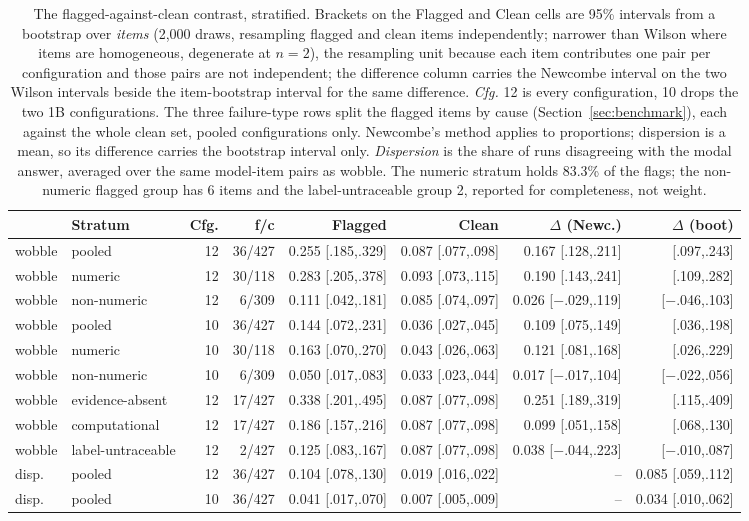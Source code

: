 \begin{table}[t]
\centering
\footnotesize
\setlength{\tabcolsep}{2.5pt}
\begin{tabular}{l l r r r r r r}
\toprule
 & Stratum & Cfg. & f/c & Flagged & Clean & $\Delta$ (Newc.) & $\Delta$ (boot) \\
\midrule
wobble & pooled & 12 & 36/427 & 0.255 [.185,.329] & 0.087 [.077,.098] & 0.167 [.128,.211] & [.097,.243] \\
wobble & numeric & 12 & 30/118 & 0.283 [.205,.378] & 0.093 [.073,.115] & 0.190 [.143,.241] & [.109,.282] \\
wobble & non-numeric & 12 & 6/309 & 0.111 [.042,.181] & 0.085 [.074,.097] & 0.026 [$-$.029,.119] & [$-$.046,.103] \\
wobble & pooled & 10 & 36/427 & 0.144 [.072,.231] & 0.036 [.027,.045] & 0.109 [.075,.149] & [.036,.198] \\
wobble & numeric & 10 & 30/118 & 0.163 [.070,.270] & 0.043 [.026,.063] & 0.121 [.081,.168] & [.026,.229] \\
wobble & non-numeric & 10 & 6/309 & 0.050 [.017,.083] & 0.033 [.023,.044] & 0.017 [$-$.017,.104] & [$-$.022,.056] \\
\midrule
wobble & evidence-absent & 12 & 17/427 & 0.338 [.201,.495] & 0.087 [.077,.098] & 0.251 [.189,.319] & [.115,.409] \\
wobble & computational & 12 & 17/427 & 0.186 [.157,.216] & 0.087 [.077,.098] & 0.099 [.051,.158] & [.068,.130] \\
wobble & label-untraceable & 12 & 2/427 & 0.125 [.083,.167] & 0.087 [.077,.098] & 0.038 [$-$.044,.223] & [$-$.010,.087] \\
\midrule
disp. & pooled & 12 & 36/427 & 0.104 [.078,.130] & 0.019 [.016,.022] & {--} & 0.085 [.059,.112] \\
disp. & pooled & 10 & 36/427 & 0.041 [.017,.070] & 0.007 [.005,.009] & {--} & 0.034 [.010,.062] \\
\bottomrule
\end{tabular}
\caption{The flagged-against-clean contrast, stratified. Brackets on the Flagged and Clean cells are 95\% intervals from a bootstrap over \emph{items} (2{,}000 draws, resampling flagged and clean items independently; narrower than Wilson where items are homogeneous, degenerate at $n = 2$), the resampling unit because each item contributes one pair per configuration and those pairs are not independent; the difference column carries the Newcombe interval on the two Wilson intervals beside the item-bootstrap interval for the same difference. \emph{Cfg.} 12 is every configuration, 10 drops the two 1B configurations. The three failure-type rows split the flagged items by cause (Section~\ref{sec:benchmark}), each against the whole clean set, pooled configurations only. Newcombe's method applies to proportions; dispersion is a mean, so its difference carries the bootstrap interval only. \emph{Dispersion} is the share of runs disagreeing with the modal answer, averaged over the same model-item pairs as wobble. The numeric stratum holds 83.3\% of the flags; the non-numeric flagged group has 6 items and the label-untraceable group 2, reported for completeness, not weight.}
\label{tab:stratified}
\end{table}
